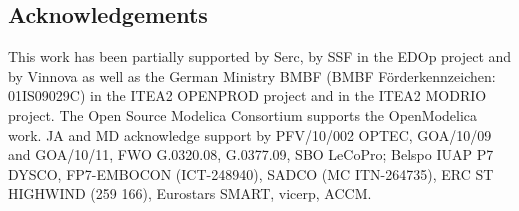 \subsection*{Acknowledgements}
\label{sec:optimizationacknowledgements}

This work has been partially supported by Serc, by SSF in the EDOp project and by Vinnova as well as the German
Ministry BMBF (BMBF F\"{o}rderkennzeichen: 01IS09029C) in the ITEA2 OPENPROD project and in the ITEA2 MODRIO
project. The Open Source Modelica Consortium supports the OpenModelica work.
JA and MD acknowledge support by PFV/10/002 OPTEC, GOA/10/09 and GOA/10/11, FWO G.0320.08, G.0377.09,
SBO LeCoPro; Belspo IUAP P7 DYSCO, FP7-EMBOCON (ICT-248940), SADCO (MC ITN-264735),
ERC ST HIGHWIND (259 166), Eurostars SMART, vicerp, ACCM.





